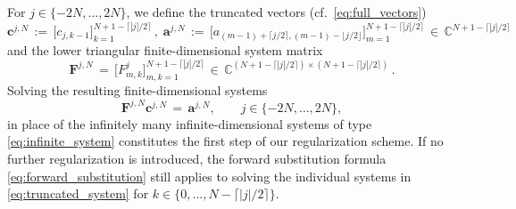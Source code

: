 \documentclass[11pt,a4paper]{article}
\theoremstyle{definition}
\theoremstyle{remark} \newtheorem{remark}[theorem]{Remark}
\numberwithin{equation}{section}
\numberwithin{figure}{section}
\numberwithin{algorithm}{section}
\numberwithin{table}{section}
\newcommand{\field}[1]{{\mathbb{#1}}}
\newcommand{\C}{\field{C}}
\newcommand{\bs}{\boldsymbol}
\newcommand{\bfa}{{\bs a}}
\newcommand{\bfc}{{\bs c}}
\newcommand{\bfF}{{\bs F}}
\begin{document}
For $j\in\{-2N,\ldots,2N\}$, we define the truncated vectors (cf.~\eqref{eq:full_vectors})
\begin{equation*}
	\bfc^{j,N} \,:=\, \big[c_{j,k-1}\big]_{k=1}^{N+1-\lceil|j|/2\rceil}\,,\;
	\bfa^{j,N} \,:=\, \big[a_{(m-1)+\lceil j/2\rceil,(m-1)-\lfloor j/2\rfloor} \big]_{m=1}^{N+1-\lceil|j|/2\rceil} \,\in\, \C^{N+1-\lceil|j|/2\rceil}
\end{equation*}
and the lower triangular finite-dimensional system matrix
\begin{equation*}
    \bfF^{j,N} \, = \, \big[F^j_{m,k} \big]_{m,k=1}^{N+1-\lceil|j|/2\rceil} \,\in\, \C^{(N+1-\lceil|j|/2\rceil)\times(N+1-\lceil|j|/2\rceil)} \, .
\end{equation*}
Solving the resulting finite-dimensional systems
\begin{equation}
\label{eq:truncated_system}
    \bfF^{j,N}\bfc^{j,N} \,=\, \bfa^{j,N}, \qquad j\in\{-2N,\ldots,2N\},
\end{equation}
in place of the infinitely many infinite-dimensional systems of type \eqref{eq:infinite_system} constitutes the first step of our regularization scheme. If no further regularization is introduced, the forward substitution formula \eqref{eq:forward_substitution} still applies to solving the individual systems in \eqref{eq:truncated_system} for $k \in \{0, \dots, N-\lceil|j|/2\rceil \}$.
\end{document}
